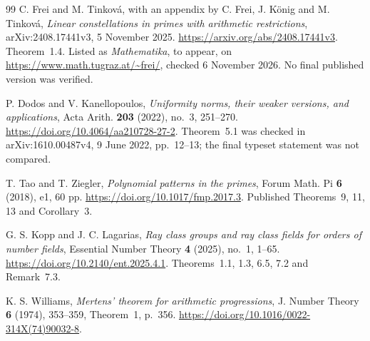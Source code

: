 \documentclass[11pt]{article}
\theoremstyle{definition}
\theoremstyle{remark}
\begin{document}
\begin{thebibliography}{99}
C. Frei and M. Tinkov\'a, with an appendix by C. Frei, J. K\"onig and
M. Tinkov\'a, \emph{Linear constellations in primes with arithmetic restrictions},
arXiv:2408.17441v3, 5 November 2025.
\url{https://arxiv.org/abs/2408.17441v3}.
Theorem~1.4. Listed as \emph{Mathematika}, to appear, on
\url{https://www.math.tugraz.at/~frei/}, checked 6 November 2026.
No final published version was verified.

P. Dodos and V. Kanellopoulos,
\emph{Uniformity norms, their weaker versions, and applications},
Acta Arith. \textbf{203} (2022), no.~3, 251--270.
\url{https://doi.org/10.4064/aa210728-27-2}.
Theorem~5.1 was checked in arXiv:1610.00487v4, 9 June 2022,
pp.~12--13; the final typeset statement was not compared.

T. Tao and T. Ziegler, \emph{Polynomial patterns in the primes},
Forum Math. Pi \textbf{6} (2018), e1, 60 pp.
\url{https://doi.org/10.1017/fmp.2017.3}.
Published Theorems~9, 11, 13 and Corollary~3.

G. S. Kopp and J. C. Lagarias,
\emph{Ray class groups and ray class fields for orders of number fields},
Essential Number Theory \textbf{4} (2025), no.~1, 1--65.
\url{https://doi.org/10.2140/ent.2025.4.1}.
Theorems~1.1, 1.3, 6.5, 7.2 and Remark~7.3.

K. S. Williams, \emph{Mertens' theorem for arithmetic progressions},
J. Number Theory \textbf{6} (1974), 353--359, Theorem~1, p.~356.
\url{https://doi.org/10.1016/0022-314X(74)90032-8}.


\end{thebibliography}
\end{document}
